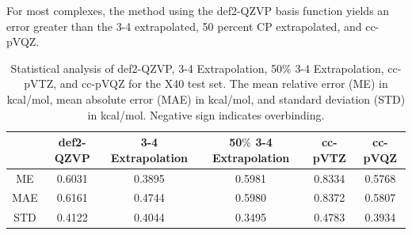 \documentclass[11pt]{article}
\begin{document}
For most complexes, the method using the def2-QZVP basis function yields
an error greater than the 3-4 extrapolated, 50 percent CP
extrapolated, and cc-pVQZ. 

\begin{table}[hbpt]
  \caption{Statistical analysis of def2-QZVP, 3-4 Extrapolation, 50$\%$ 3-4
    Extrapolation, cc-pVTZ, and cc-pVQZ for the X40 test set. The mean
    relative error (ME) in kcal/mol, mean absolute error (MAE) in kcal/mol,
    and standard deviation (STD) in kcal/mol. Negative sign indicates overbinding.}
  \centering
  \begin{tabular}{c|c|c|c|c|c}
    & def2-QZVP & 3-4 Extrapolation & 50$\%$ 3-4 Extrapolation & cc-pVTZ  &
    cc-pVQZ \\
    \hline\hline
    ME & 0.6031 & 0.3895 & 0.5981 & 0.8334 & 0.5768 \\
    MAE & 0.6161 & 0.4744 & 0.5980 & 0.8372 & 0.5807 \\
    STD & 0.4122 & 0.4044 & 0.3495 & 0.4783 & 0.3934 \\
  \end{tabular}
  \label{tab:table_1}
\end{table}
\end{document}
